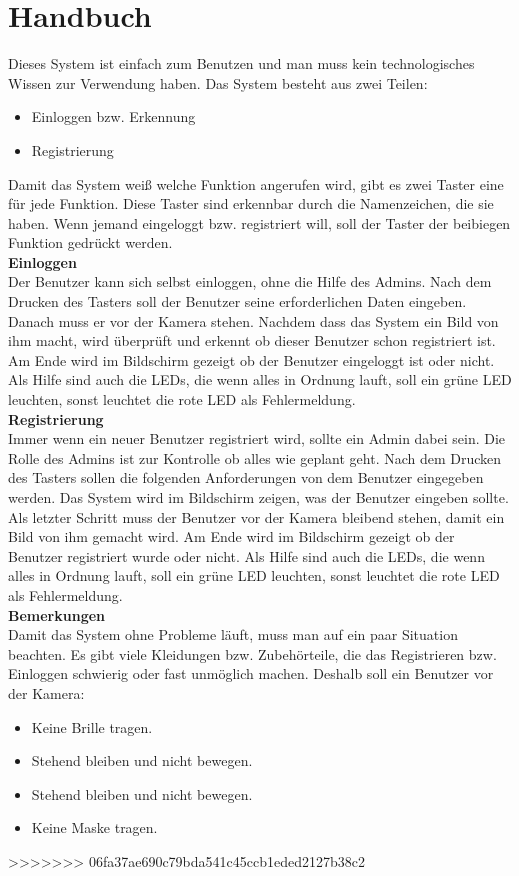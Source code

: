 \chapter{Handbuch}
Dieses System ist einfach zum Benutzen und man muss kein technologisches Wissen zur Verwendung haben. Das System besteht aus zwei Teilen: 
\begin{itemize}
	\item Einloggen bzw. Erkennung 
	\item Registrierung 
\end{itemize}
Damit das System weiß welche Funktion angerufen wird, gibt es zwei Taster eine für jede Funktion. Diese Taster sind erkennbar durch die Namenzeichen, die sie haben. Wenn jemand eingeloggt bzw. registriert will, soll der Taster der beibiegen Funktion gedrückt werden. \\
\textbf{Einloggen} \\
Der Benutzer kann sich selbst einloggen, ohne die Hilfe des Admins. Nach dem Drucken des Tasters soll der Benutzer seine erforderlichen Daten eingeben. Danach muss er vor der Kamera stehen. Nachdem dass das System ein Bild von ihm macht, wird überprüft und erkennt ob dieser Benutzer schon registriert ist. Am Ende wird im Bildschirm gezeigt ob der Benutzer eingeloggt ist oder nicht. Als Hilfe sind auch die LEDs, die wenn alles in Ordnung lauft, soll ein grüne LED leuchten, sonst leuchtet die rote LED als Fehlermeldung. \\
\textbf{Registrierung} \\
Immer wenn ein neuer Benutzer registriert wird, sollte ein Admin dabei sein. Die Rolle des Admins ist zur Kontrolle ob alles wie geplant geht. Nach dem Drucken des Tasters sollen die folgenden Anforderungen von dem Benutzer eingegeben werden. Das System wird im Bildschirm zeigen, was der Benutzer eingeben sollte. Als letzter Schritt muss der Benutzer vor der Kamera bleibend stehen, damit ein Bild von ihm gemacht wird. Am Ende wird im Bildschirm gezeigt ob der Benutzer registriert wurde oder nicht.  Als Hilfe sind auch die LEDs, die wenn alles in Ordnung lauft, soll ein grüne LED leuchten, sonst leuchtet die rote LED als Fehlermeldung. \\
\textbf{Bemerkungen}\\
Damit das System ohne Probleme läuft, muss man auf ein paar Situation beachten. Es gibt viele Kleidungen bzw. Zubehörteile, die das Registrieren bzw. Einloggen schwierig oder fast unmöglich machen. Deshalb soll ein Benutzer vor der Kamera: 
\begin{itemize}
	\item Keine Brille tragen. 
	\item Stehend bleiben und nicht bewegen. 
	\item Stehend bleiben und nicht bewegen. 
	\item Keine Maske tragen. 
\end{itemize}
>>>>>>> 06fa37ae690c79bda541c45ccb1eded2127b38c2
